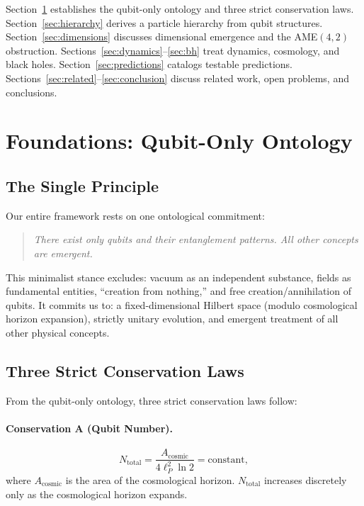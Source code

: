 \documentclass[11pt,a4paper]{article}
\begin{document}
Section~\ref{sec:foundations} establishes the qubit-only ontology and three strict conservation laws. Section~\ref{sec:hierarchy} derives a particle hierarchy from qubit structures. Section~\ref{sec:dimensions} discusses dimensional emergence and the AME$(4,2)$ obstruction. Sections~\ref{sec:dynamics}--\ref{sec:bh} treat dynamics, cosmology, and black holes. Section~\ref{sec:predictions} catalogs testable predictions. Sections~\ref{sec:related}--\ref{sec:conclusion} discuss related work, open problems, and conclusions.

\section{Foundations: Qubit-Only Ontology}
\label{sec:foundations}

\subsection{The Single Principle}

Our entire framework rests on one ontological commitment:
\begin{quote}
\textit{There exist only qubits and their entanglement patterns. All other concepts are emergent.}
\end{quote}

This minimalist stance excludes: vacuum as an independent substance, fields as fundamental entities, ``creation from nothing,'' and free creation/annihilation of qubits. It commits us to: a fixed-dimensional Hilbert space (modulo cosmological horizon expansion), strictly unitary evolution, and emergent treatment of all other physical concepts.

\subsection{Three Strict Conservation Laws}

From the qubit-only ontology, three strict conservation laws follow:

\paragraph{Conservation A (Qubit Number).}
\begin{equation}
N_{\text{total}} = \frac{A_{\text{cosmic}}}{4\ell_P^2 \ln 2} = \text{constant},
\end{equation}
where $A_{\text{cosmic}}$ is the area of the cosmological horizon. $N_{\text{total}}$ increases discretely only as the cosmological horizon expands.
\end{document}
